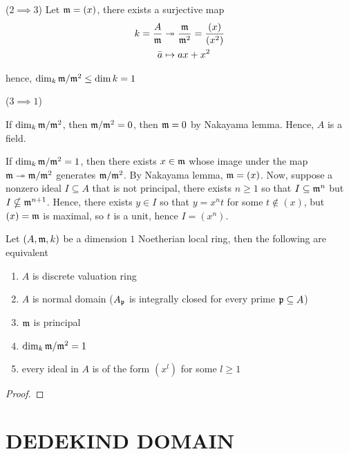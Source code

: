\begin{longproof}
	($2 \implies 3$) Let $\mathfrak{m} = (x)$, there exists a surjective map
	\begin{align*}
		k = \frac{A}{\mathfrak{m}} &\twoheadrightarrow \frac{\mathfrak{m}}{\mathfrak{m}^2} = \frac{(x)}{(x^2)} \\
		\bar{a} &\mapsto ax + x^2
	\end{align*}
	
	hence, $\dim_k \mathfrak{m} / \mathfrak{m}^2 \leq \dim k = 1$
	
	($3 \implies 1$)
	
	If $\dim_k \mathfrak{m} / \mathfrak{m}^2$, then $\mathfrak{m} / \mathfrak{m}^2 = 0$, then $\mathfrak{m} = 0$ by Nakayama lemma. Hence, $A$ is a field.
	
	If $\dim_k \mathfrak{m} / \mathfrak{m}^2 = 1$, then there exists $x \in \mathfrak{m}$ whose image under the map $\mathfrak{m} \twoheadrightarrow \mathfrak{m} / \mathfrak{m}^2$ generates $\mathfrak{m} / \mathfrak{m}^2$. By Nakayama lemma, $\mathfrak{m} = (x)$. Now, suppose a nonzero ideal $I \subseteq A$ that is not principal, there exists $n \geq 1$ so that $I \subseteq \mathfrak{m}^n$ but $I \nsubseteq \mathfrak{m}^{n+1}$. Hence, there exists $y \in I$ so that $y  = x^n t$ for some $t \notin (x)$, but $(x) = \mathfrak{m}$ is maximal, so $t$ is a unit, hence $I = (x^n)$. 
\end{longproof}

\begin{proposition}
	Let $(A, \mathfrak{m}, k)$ be a dimension $1$ Noetherian local ring, then the following are equivalent
	\begin{enumerate}
		\item $A$ is discrete valuation ring
		\item $A$ is normal domain ($A_{\mathfrak{p}}$ is integrally closed for every prime $\mathfrak{p} \subseteq A$)
		\item $\mathfrak{m}$ is principal
		\item $\dim_k \mathfrak{m} / \mathfrak{m}^2  = 1$
		\item every ideal in $A$ is of the form $(x^l)$ for some $l \geq 1$ 
	\end{enumerate}
\end{proposition}

\begin{proof}
\end{proof}

\section{DEDEKIND DOMAIN}

